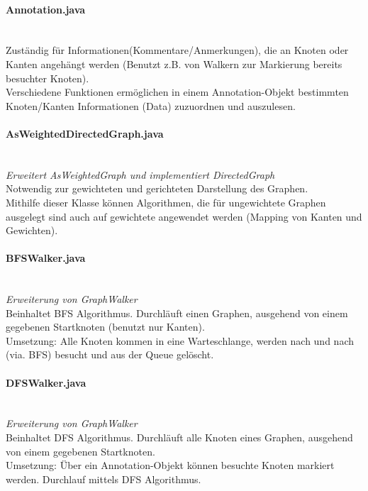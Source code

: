 \documentclass[10pt,a4paper]{article}
\begin{document}
\paragraph{Annotation.java}\ \\
Zuständig für Informationen(Kommentare/Anmerkungen), die an Knoten oder Kanten angehängt werden (Benutzt z.B. von Walkern zur Markierung bereits besuchter Knoten).\\
Verschiedene Funktionen ermöglichen in einem Annotation-Objekt bestimmten Knoten/Kanten Informationen (Data) zuzuordnen und auszulesen.\\

\paragraph{AsWeightedDirectedGraph.java}\ \\
\emph{Erweitert AsWeightedGraph und implementiert DirectedGraph}\\
Notwendig zur gewichteten und gerichteten Darstellung des Graphen.\\
Mithilfe dieser Klasse können Algorithmen, die für ungewichtete Graphen ausgelegt sind auch auf gewichtete angewendet werden (Mapping von Kanten und Gewichten).\\

\paragraph{BFSWalker.java}\ \\
\emph{Erweiterung von GraphWalker}\\
Beinhaltet BFS Algorithmus. Durchläuft einen Graphen, ausgehend von einem gegebenen Startknoten (benutzt nur Kanten).\\
Umsetzung: Alle Knoten kommen in eine Warteschlange, werden nach und nach (via. BFS) besucht und aus der Queue gelöscht.\\

\paragraph{DFSWalker.java}\ \\
\emph{Erweiterung von GraphWalker}\\
Beinhaltet DFS Algorithmus. Durchläuft alle Knoten eines Graphen, ausgehend von einem gegebenen Startknoten.\\
Umsetzung: Über ein Annotation-Objekt können besuchte Knoten markiert werden. Durchlauf mittels DFS Algorithmus.\\
\end{document}
